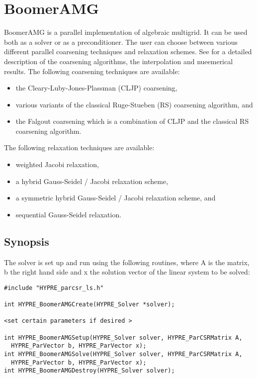 \section{BoomerAMG}

BoomerAMG is a parallel implementation of algebraic multigrid.
It can be used both as a solver or as a preconditioner.
The user can choose between various different parallel coarsening techniques
and relaxation schemes.
See \cite{Henson_Yang:2000} for a detailed description of the coarsening 
algorithms, the interpolation and nueemerical results.
The following coarsening techniques are available:
\begin{itemize}
\item the Cleary-Luby-Jones-Plassman (CLJP) coarsening,
\item various variants of the classical Ruge-Stueben (RS) coarsening algorithm, and
\item the Falgout coarsening which is a combination of CLJP and the
classical RS coarsening algorithm.
\end{itemize}
The following relaxation techniques are available:
\begin{itemize}
\item weighted Jacobi relaxation,
\item a hybrid Gauss-Seidel / Jacobi relaxation scheme, 
\item a symmetric hybrid Gauss-Seidel / Jacobi relaxation scheme, and
\item sequential Gauss-Seidel relaxation.
\end{itemize}


\subsection{Synopsis}

The solver is set up and run using the following routines,
where A is the matrix, b the right hand side and x the solution vector
of the linear system to be solved:

\begin{display}
\begin{verbatim}
#include "HYPRE_parcsr_ls.h"

int HYPRE_BoomerAMGCreate(HYPRE_Solver *solver); 

<set certain parameters if desired >

int HYPRE_BoomerAMGSetup(HYPRE_Solver solver, HYPRE_ParCSRMatrix A,
  HYPRE_ParVector b, HYPRE_ParVector x);
int HYPRE_BoomerAMGSolve(HYPRE_Solver solver, HYPRE_ParCSRMatrix A,
  HYPRE_ParVector b, HYPRE_ParVector x);
int HYPRE_BoomerAMGDestroy(HYPRE_Solver solver);
\end{verbatim}
\end{display}

